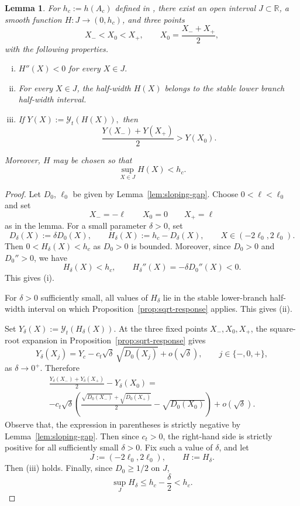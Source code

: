\documentclass[reqno,12pt]{amsart}
\numberwithin{equation}{section}
\newtheorem{lemma}[theorem]{Lemma}
\theoremstyle{remark}
\begin{document}
\begin{lemma}\label{lem:formal-midpoint}
For $h_c:=h(A_c)$ defined in , there exist an open interval $J\subset\mathbb R$, a smooth function
$H:J\to(0,h_c)$, and three points
$$
X_-<X_0<X_+, \qquad X_0=\frac{X_-+X_+}{2},
$$
with the following properties.
\begin{enumerate}[(i)]
    \item $ H''(X)<0$ for every $X\in J.$
    \item For every $X\in J$, the half-width $H(X)$ belongs to the stable lower branch half-width interval.
    \item If $ Y(X):=\mathcal Y_t(H(X)),$
then
$$
\frac{Y(X_-)+Y(X_+)}2>Y(X_0).
$$
\end{enumerate}
Moreover, $H$ may be chosen so that
$$
\sup_{X\in J}H(X)<h_c.
$$
\end{lemma}

\begin{proof}
Let $D_0$, $\ell_0$ be given by
Lemma~\ref{lem:sloping-gap}. Choose  $0<\ell <\ell_0$ and set 
$$X_-=-\ell \qquad X_0=0 \qquad X_+=\ell$$
as in the lemma.  For a small parameter $\delta>0$, set
$$
D_\delta(X):=\delta D_0(X),
\qquad
H_\delta(X):=h_c-D_\delta(X),
\qquad
X\in(-2\ell_0,2\ell_0).
$$
Then $0<H_\delta(X)<h_c$ as $D_0>0$ is bounded. 
Moreover, since $D_0>0$ and $D_0''>0$, we have
$$
H_\delta(X)<h_c, \qquad H_\delta''(X)=-\delta D_0''(X)<0.
$$
This gives (i). 

For $\delta>0$ sufficiently small, all values of $H_\delta$ lie in the stable lower-branch half-width interval on which  Proposition~\ref{prop:sqrt-response} applies. This gives (ii).


Set $Y_\delta(X):=\mathcal Y_t(H_\delta(X)).$
At the three fixed points $X_-,X_0,X_+$, the square-root expansion in Proposition~\ref{prop:sqrt-response} gives
$$
Y_\delta(X_j) = Y_c-c_t\sqrt{\delta}\,\sqrt{D_0(X_j)}+o(\sqrt\delta),
\qquad j\in\{-,0,+\},
$$
as $\delta\to 0^+$.  Therefore
\begin{multline*}
\frac{Y_\delta(X_-)+Y_\delta(X_+)}2-Y_\delta(X_0)
=  \\
-c_t\sqrt\delta
\left(\frac{\sqrt{D_0(X_-)}+\sqrt{D_0(X_+)}}2-
\sqrt{D_0(X_0)}\right)
+o(\sqrt\delta).
\end{multline*}
Observe that, the expression in parentheses is strictly negative by Lemma~\ref{lem:sloping-gap}.
Then since $c_t>0$, the right-hand side is strictly positive for all sufficiently
small $\delta>0$.  Fix such a value of $\delta$, and let
$$
J:=(-2\ell_0,2\ell_0), \qquad H:=H_\delta.
$$
Then (iii) holds. Finally, since $D_0\ge 1/2$ on $J$, 
$$\sup_{J} H_\delta\le h_c-\frac \delta 2 <h_c.$$
\end{proof}
\end{document}

